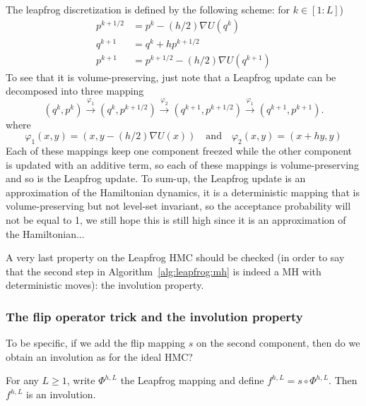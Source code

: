 \documentclass[english,graybox,envcountchap,envcountsame,sectrefs,shortlabels]{svmono}
\theoremstyle{style}
\begin{document}
The leapfrog discretization is defined by the following scheme: for $k \in[1:L]$)
\begin{align}
p^{k+1/2}&=p^k-(h/2) \nabla U(q^k) \nonumber\\
q^{k+1}&=q^k+h p^{k+1/2}\nonumber \\
p^{k+1}&=p^{k+1/2}-(h/2) \nabla U (q^{k+1}) \label{eq:leap:update}
\end{align}
To see that it is volume-preserving, just note that a Leapfrog update can be decomposed into three mapping
\begin{equation}
\label{eq:leap:decomp}
(q^k,p^k) \stackrel{\varphi_1}{\longrightarrow} (q^k,p^{k+1/2}) \stackrel{\varphi_2}{\longrightarrow} (q^{k+1},p^{k+1/2}) \stackrel{\varphi_1}{\longrightarrow} (q^{k+1},p^{k+1}).
\end{equation}
where
\begin{equation}\label{eq:def:varphi}
\varphi_1(x,y)=(x,y-(h/2)\nabla U(x))\quad \mbox{and}\quad  \varphi_2(x,y)=(x+hy,y)
\end{equation}
Each of these mappings keep one component freezed while the other component is updated with an additive term, so each of these mappings is volume-preserving and so is the Leapfrog update. To sum-up, the Leapfrog update is an approximation of the Hamiltonian dynamics, it is a deterministic mapping that is volume-preserving but not level-set invariant, so the acceptance probability will not be equal to 1, we still hope this is still high since it is an approximation of the Hamiltonian...

A very last property on the Leapfrog HMC should be checked (in order to say that the second step in Algorithm~\ref{alg:leapfrog:mh} is indeed a MH with deterministic moves): the involution property.

\subsubsection{The flip operator trick and the involution property}
To be specific, if we add the flip mapping $s$ on the second component, then do we obtain an involution as for the ideal HMC?

\begin{shaded}
\begin{lemma}
For any $L\geq 1$, write $\Phi^{h,L}$ the Leapfrog mapping and define $f^{h,L}=s\circ \Phi^{h,L}$.
Then $f^{h,L}$ is an involution.
\end{lemma}

\end{shaded}
\end{document}
